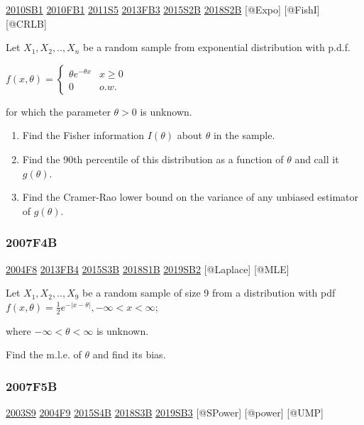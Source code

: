 \documentclass[6pt,twocolumn,Portrait]{article}
\begin{document}
\protect\hyperlink{sb1-1}{2010SB1} \protect\hyperlink{fb1-1}{2010FB1}
\protect\hyperlink{s5-2}{2011S5} \protect\hyperlink{fb3-2}{2013FB3}
\protect\hyperlink{s2b-1}{2015S2B} \protect\hyperlink{s2b-2}{2018S2B}
{[}@Expo{]} {[}@FishI{]} {[}@CRLB{]}

Let \(X_1,X_2,..,X_n\) be a random sample from exponential distribution
with p.d.f.

\(f(x,\theta)=\begin{cases}\theta e^{-\theta x}& x\ge0\\0& o.w.\end{cases}\)

for which the parameter \(\theta>0\) is unknown.

\begin{enumerate}
\def\labelenumi{(\alph{enumi})}
\item
  Find the Fisher information \(I(\theta)\) about \(\theta\) in the
  sample.
\item
  Find the 90th percentile of this distribution as a function of
  \(\theta\) and call it \(g(\theta)\).
\item
  Find the Cramer-Rao lower bound on the variance of any unbiased
  estimator of \(g(\theta)\).
\end{enumerate}

\hypertarget{f4b}{%
\subsubsection{2007F4B}\label{f4b}}

\protect\hyperlink{f8-2}{2004F8} \protect\hyperlink{fb4-2}{2013FB4}
\protect\hyperlink{s3b-1}{2015S3B} \protect\hyperlink{s1b-2}{2018S1B}
\protect\hyperlink{sb2-3}{2019SB2} {[}@Laplace{]} {[}@MLE{]}

Let \(X_1,X_2,..,X_9\) be a random sample of size 9 from a distribution
with pdf \(f(x,\theta) =\frac12e^{-|x-\theta|}, -\infty<x<\infty\);

where \(-\infty<\theta<\infty\) is unknown.

Find the m.l.e. of \(\theta\) and find its bias.

\hypertarget{f5b}{%
\subsubsection{2007F5B}\label{f5b}}

\protect\hyperlink{s9}{2003S9} \protect\hyperlink{f9-2}{2004F9}
\protect\hyperlink{s4b-1}{2015S4B} \protect\hyperlink{s3b-2}{2018S3B}
\protect\hyperlink{sb3-3}{2019SB3} {[}@SPower{]} {[}@power{]} {[}@UMP{]}
\end{document}

